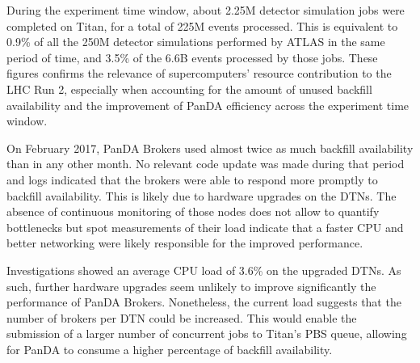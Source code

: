 

During the experiment time window, about 2.25M detector simulation jobs were
completed on Titan, for a total of 225M events processed. This is equivalent to
0.9\% of all the 250M detector simulations performed by ATLAS in the same period
of time, and 3.5\% of the 6.6B events processed by those jobs.
These figures confirms the relevance of supercomputers' resource contribution to
the LHC Run 2, especially when accounting for the amount of unused backfill
availability and the improvement of PanDA efficiency across the experiment time
window.


On February 2017, PanDA Brokers used almost twice as much backfill availability
than in any other month. No relevant code update was made during that period and
logs indicated that the brokers were able to respond more promptly to backfill
availability. This is likely due to hardware upgrades on the DTNs. The absence
of continuous monitoring of those nodes does not allow to quantify bottlenecks
but spot measurements of their load indicate that a faster CPU and better
networking were likely responsible for the improved performance.

Investigations showed an average CPU load of 3.6\% on the upgraded DTNs. As
such, further hardware upgrades seem unlikely to improve significantly the
performance of PanDA Brokers. Nonetheless, the current load suggests that the
number of brokers per DTN could be increased. This would enable the submission
of a larger number of concurrent jobs to Titan's PBS queue, allowing for PanDA
to consume a higher percentage of backfill availability.

